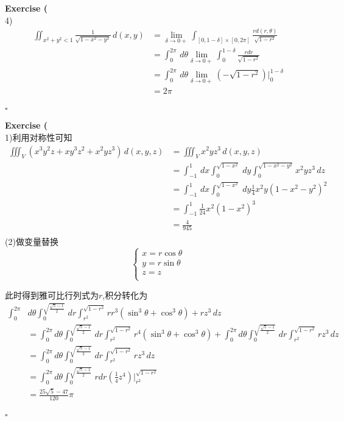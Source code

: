 \documentclass[11pt,hyperref,a4paper,UTF8]{ctexart}
\newenvironment{exercise}[1]{%
{\textbf{Exercise #1} \\ 
    }
}{
  \hfill $\square$ 
  \par\bigskip 
}
\newcommand{\parameter}[1]{\left(#1\right)}
\begin{document}
\begin{CJK}{UTF8}{gkai}
\begin{exercise}{9}
    (4)\[\begin{aligned}
        \iint_{x^2 + y^2 < 1} \frac{1}{\sqrt{1 - x^2 - y^2}}\,d(x,y) &= \lim_{\delta \to 0+}\int_{[0,1 - \delta]\times[0,2\pi]} \frac{r d(r,\theta)}{\sqrt{1 - r^2}}\\
        &= \int_{0}^{2\pi} \, d\theta \lim_{\delta \to 0+}\int_{0}^{1 - \delta} \frac{r dr}{\sqrt{1 - r^2}}\\
        &= \int_{0}^{2\pi} \, d\theta \lim_{\delta \to 0+}(-\sqrt{1 - r^2})\bigg|_0^{1 - \delta}\\
        &= 2\pi\\
    \end{aligned}\]
\end{exercise}

\begin{exercise}{10}
    (1)利用对称性可知
    \[
    \begin{aligned}
        \iiint_V(x^3 y^2 z + xy^3z^2 + x^2 y z^3)\, d(x,y,z) &= \iiint_V x^2 y z^3\, d(x,y,z)\\
        &= \int_{-1}^{1}\, dx \int_{0}^{\sqrt{1 - x^2}}\, dy\int_{0}^{\sqrt{1 - x^2 - y^2}}x^2 y z^3\, dz\\
        &= \int_{-1}^{1}\, dx \int_{0}^{\sqrt{1 - x^2}}\, dy \frac{1}{4}x^2 y(1 - x^2 - y^2)^2\\
        &= \int_{-1}^{1} \frac{1}{24}x^2(1 - x^2)^3\\
        &= \frac{4}{945}\\
    \end{aligned}    
    \]
    (2)做变量替换
    \[\begin{cases}
        x = r \cos \theta\\
        y = r \sin \theta\\
        z = z\\
      \end{cases}\]

      此时得到雅可比行列式为$r$,积分转化为
      \[
      \begin{aligned}
        \int_{0}^{2\pi} & d\theta\int_{0}^{\sqrt{\frac{\sqrt{5} - 1}{2}}}\,dr \int_{r^2}^{\sqrt{1 - r^2}}r r^3(\sin^3 \theta+ \cos^3\theta) + r z^3\, dz \\
        &=\int_{0}^{2\pi}d\theta\int_{0}^{\sqrt{\frac{\sqrt{5} - 1}{2}}}\,dr \int_{r^2}^{\sqrt{1 - r^2}}r^4(\sin^3 \theta+ \cos^3\theta) + \int_{0}^{2\pi}d\theta\int_{0}^{\sqrt{\frac{\sqrt{5} - 1}{2}}}\,dr \int_{r^2}^{\sqrt{1 - r^2}} rz^3\, dz\\
        &= \int_{0}^{2\pi}d\theta\int_{0}^{\sqrt{\frac{\sqrt{5} - 1}{2}}}\,dr\int_{r^2}^{\sqrt{1 - r^2}} rz^3\, dz\\
        &= \int_{0}^{2\pi}d\theta\int_{0}^{\sqrt{\frac{\sqrt{5} - 1}{2}}}\,r dr \parameter{\frac{1}{4}z^4}\bigg|_{r^2}^{\sqrt{1 - r^2}} \\  
        &= \frac{25\sqrt{5} - 47}{120}\pi\\ 
    \end{aligned}  
      \]


\end{exercise}
\end{CJK}
\end{document}

